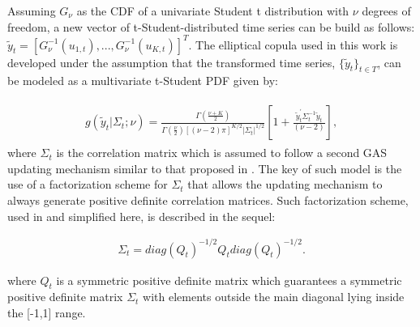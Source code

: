 \documentclass[a4paper]{IEEEtran}
\begin{document}

Assuming $G_{\nu}$ as the CDF of a univariate Student t distribution with $\nu$ degrees of freedom, a new vector of t-Student-distributed time series can be build as follows: $\tilde{y}_{t}=[G_{\nu}^{-1}(u_{1,t}), ..., G_{\nu}^{-1}(u_{K,t})]^T$. The elliptical copula used in this work is developed under the assumption that the transformed time series, $\{\tilde{y}_{t}\}_{t\in T}$, can be modeled as a multivariate t-Student PDF given by:

\begin{align} 
\begin{split}
g(\tilde{y}_{t}|\Sigma_{t}; \nu) = \frac{\Gamma\left(\frac{\nu+K}{2}\right)}{\Gamma\left(\frac{\nu}{2}\right) [(\nu-2)\pi]^{K/2} |\Sigma_{t}|^{1/2}} \left[ 1+ \frac{\tilde{y}_{t}^{'}\Sigma_{t}^{-1}\tilde{y}_{t}}{(\nu-2)} \right], \label{eq:denstmulti}
\end{split} 
\end{align}
\noindent
where $\Sigma_t$ is the correlation matrix which is assumed to follow a second GAS updating mechanism similar to that proposed in \cite{engle2002dynamic}. The key of such model is the use of a factorization scheme for $\Sigma_t$ that allows the updating mechanism to always generate positive definite correlation matrices. Such factorization scheme, used in \cite{engle2002dynamic} and simplified here, is described in the sequel: 

\begin{align}
\Sigma_{t} = diag(Q_{t})^{-1/2}Q_{t}diag(Q_{t})^{-1/2}. \label{sigma}
\end{align}

\noindent
where $Q_{t}$ is a symmetric positive definite matrix which guarantees a symmetric positive definite matrix $\Sigma_{t}$ with elements outside the main diagonal lying inside the [-1,1] range.
\end{document}
